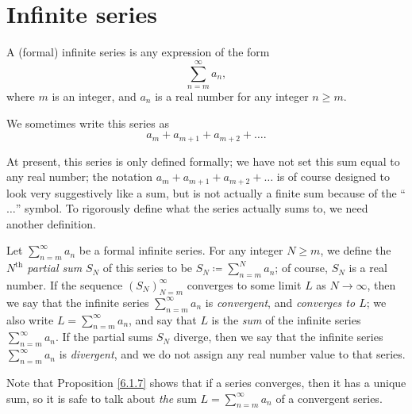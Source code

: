 \section{Infinite series}\label{sec 7.2}

\begin{definition}\label{7.2.1}
A (formal) infinite series is any expression of the form
\[
    \sum_{n = m}^\infty a_n,
\]
where \(m\) is an integer, and \(a_n\) is a real number for any integer \(n \geq m\).
\end{definition}

\begin{note}
We sometimes write this series as
\[
    a_m + a_{m + 1} + a_{m + 2} + \dots.
\]
\end{note}

\begin{note}
At present, this series is only defined formally;
we have not set this sum equal to any real number;
the notation \(a_m + a_{m + 1} + a_{m + 2} + \dots\) is of course designed to look very suggestively like a sum, but is not actually a finite sum because of the ``\(\dots\)'' symbol.
To rigorously define what the series actually sums to, we need another definition.
\end{note}

\begin{definition}\label{7.2.2}
Let \(\sum_{n = m}^\infty a_n\) be a formal infinite series.
For any integer \(N \geq m\), we define the \emph{\(N^{\text{th}}\) partial sum} \(S_N\) of this series to be \(S_N \coloneqq \sum_{n = m}^N a_n\);
of course, \(S_N\) is a real number.
If the sequence \((S_N)_{N = m}^\infty\) converges to some limit \(L\) as \(N \to \infty\), then we say that the infinite series \(\sum_{n = m}^\infty a_n\) is \emph{convergent}, and \emph{converges to \(L\)};
we also write \(L = \sum_{n = m}^\infty a_n\), and say that \(L\) is the \emph{sum} of the infinite series \(\sum_{n = m}^\infty a_n\).
If the partial sums \(S_N\) diverge, then we say that the infinite series \(\sum_{n = m}^\infty a_n\) is \emph{divergent}, and we do not assign any real number value to that series.
\end{definition}

\begin{remark}\label{7.2.3}
Note that Proposition \ref{6.1.7} shows that if a series converges, then it has a unique sum, so it is safe to talk about \emph{the} sum \(L = \sum_{n = m}^\infty a_n\) of a convergent series.
\end{remark}

